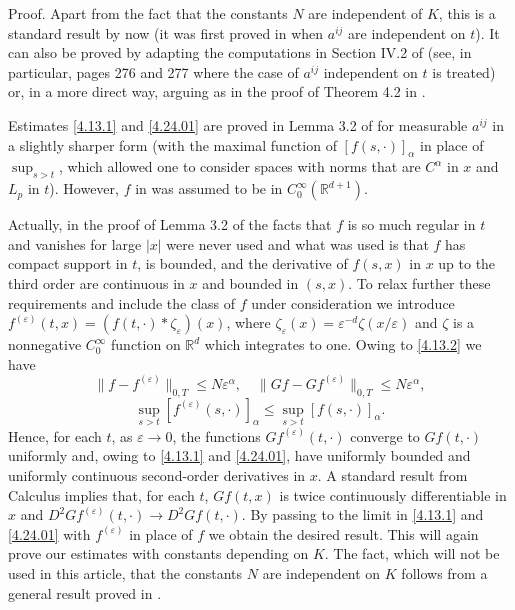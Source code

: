 \documentclass[reqno,12pt]{amsart}
\theoremstyle{definition}
\theoremstyle{remark}
\begin{document}
    Proof.
    Apart from the fact that the constants $N$
    are
   independent of $K$, this   is   a
   standard   result  by now  (it was first proved in  \cite{B}
    when $a^{ij}$ are independent on $t$).
   It can  also be
   proved by adapting  the computations  in Section IV.2 of \cite{LSU}
   (see, in particular, pages 276 and 277 where the case of
    $a^{ij}$  independent on $t$ is treated) or, in a more direct
    way,   arguing as in the proof
      of  Theorem 4.2 in \cite{P1}.

   Estimates \eqref{4.13.1} and \eqref{4.24.01} are proved
   in Lemma 3.2 of \cite{Kry2}  for measurable
$a^{ij}$  in a slightly sharper form (with the maximal function of
$[f(s,\cdot)]_{\alpha}$ in place of $\sup_{s> t}$, which allowed
one to consider spaces with norms that are $C^{\alpha}$ in $x$ and
$L_{p}$ in $t$). However, $f$ in \cite{Kry2} was assumed to be in
$C^{\infty}_{0} ({\mathbb{R}}^{d+1})$.

Actually, in the proof of Lemma 3.2 of \cite{Kry2} the facts that
$f$ is so  much regular in $t$ and vanishes for large $|x|$ were
never used and what was used is that $f$ has compact support in
$t$, is bounded, and the derivative of $f(s,x)$ in $x$ up to the
third order are continuous in $x$ and bounded in $(s,x)$. To relax
further these requirements and include the class of $f$ under
consideration we introduce
$f^{(\varepsilon)}(t,x)=(f(t,\cdot)*\zeta_{\varepsilon})(x)$,
where
$\zeta_{\varepsilon}(x)=\varepsilon^{-d}\zeta(x/\varepsilon)$ and
$\zeta$ is a nonnegative $C^{\infty}_{0}$ function on ${\mathbb{R}}^{d}$
which integrates to one. Owing to \eqref{4.13.2} we have
$$
\|f-f^{(\varepsilon)}\|_{0,T}\leq N\varepsilon^{\alpha},\quad
\|Gf-Gf^{(\varepsilon)}\|_{0,T}\leq N\varepsilon^{\alpha},
$$
$$
\sup_{s>t}[f^{(\varepsilon)}(s,\cdot)]_{\alpha} \leq \sup_{s>t}
[f(s,\cdot)]_{\alpha}.
$$
Hence, for each $t$, as $\varepsilon\to0$, the functions
$Gf^{(\varepsilon)}(t,\cdot)$ converge to $Gf(t,\cdot)$ uniformly
and, owing to \eqref{4.13.1} and \eqref{4.24.01}, have uniformly
bounded and uniformly continuous second-order derivatives in $x$.
A standard result from Calculus implies that, for each $t$,
$Gf(t,x)$ is twice continuously differentiable in $x$ and
$D^{2}Gf^{(\varepsilon)}(t,\cdot) \to D^{2}Gf (t,\cdot)$. By
passing to the limit in \eqref{4.13.1} and \eqref{4.24.01} with
$f^{(\varepsilon)}$ in place of $f$ we obtain the desired result.
This will again prove our estimates with constants depending on
$K$. The fact, which will not be used in this article,
   that the constants $N$ are independent on $K$
follows from a general result proved in \cite{Kry3}.
\end{document}
